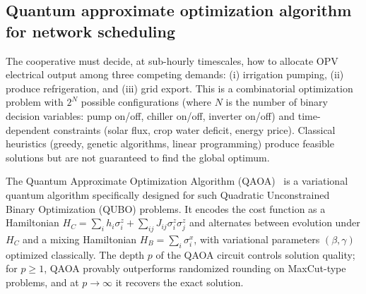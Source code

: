 \documentclass[11pt,a4paper]{article}
\begin{document}
\subsection{Quantum approximate optimization algorithm for network scheduling}
\label{SI-sec:qaoa}

The cooperative must decide, at sub-hourly timescales, how to allocate OPV electrical output among three competing demands: (i) irrigation pumping, (ii) produce refrigeration, and (iii) grid export. This is a combinatorial optimization problem with $2^N$ possible configurations (where $N$ is the number of binary decision variables: pump on/off, chiller on/off, inverter on/off) and time-dependent constraints (solar flux, crop water deficit, energy price). Classical heuristics (greedy, genetic algorithms, linear programming) produce feasible solutions but are not guaranteed to find the global optimum.

The Quantum Approximate Optimization Algorithm (QAOA)~\cite{Farhi2014} is a variational quantum algorithm specifically designed for such Quadratic Unconstrained Binary Optimization (QUBO) problems. It encodes the cost function as a Hamiltonian $H_C = \sum_i h_i \sigma_i^z + \sum_{ij} J_{ij} \sigma_i^z \sigma_j^z$ and alternates between evolution under $H_C$ and a mixing Hamiltonian $H_B = \sum_i \sigma_i^x$, with variational parameters $(\beta, \gamma)$ optimized classically. The depth $p$ of the QAOA circuit controls solution quality; for $p \geq 1$, QAOA provably outperforms randomized rounding on MaxCut-type problems, and at $p \to \infty$ it recovers the exact solution.
\end{document}
